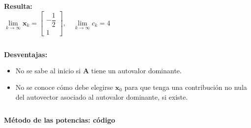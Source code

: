 \documentclass[9pt, aspectratio=169]{beamer}
\begin{document}
\begin{frame}
\begin{columns}[t]
\textbf{Resulta:}
\[ \lim_{k \rightarrow \infty} \bm{x}_k = \begin{bmatrix} -\dfrac{1}{2} \\ 1 \end{bmatrix}, \quad \lim_{k \rightarrow \infty} c_k = 4 \]
\end{columns}
\hrulefill \pause

\textbf{Desventajas:}
\begin{itemize}
    \item No se sabe al inicio si $\bm{A}$ tiene un autovalor dominante.
    \item No se conoce cómo debe elegirse $\bm{x}_0$ para que tenga una contribución no nula del autovector asociado al autovalor dominante, si existe.
\end{itemize}
\end{frame}

\begin{frame}[fragile]

\begin{columns}[t]
\textbf{Método de las potencias: código}


\end{columns}
\end{frame}
\end{document}

